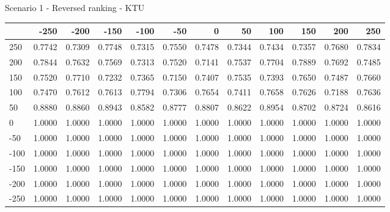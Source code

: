 Scenario 1 - Reversed ranking - KTU
\begin{tabular}{lrrrrrrrrrrr}
\toprule
{} &   -250 &   -200 &   -150 &   -100 &   -50  &    0   &    50  &    100 &    150 &    200 &    250 \\
\midrule
 250 & 0.7742 & 0.7309 & 0.7748 & 0.7315 & 0.7550 & 0.7478 & 0.7344 & 0.7434 & 0.7357 & 0.7680 & 0.7834 \\
 200 & 0.7844 & 0.7632 & 0.7569 & 0.7313 & 0.7520 & 0.7141 & 0.7537 & 0.7704 & 0.7889 & 0.7692 & 0.7485 \\
 150 & 0.7520 & 0.7710 & 0.7232 & 0.7365 & 0.7150 & 0.7407 & 0.7535 & 0.7393 & 0.7650 & 0.7487 & 0.7660 \\
 100 & 0.7470 & 0.7612 & 0.7613 & 0.7794 & 0.7306 & 0.7654 & 0.7411 & 0.7658 & 0.7626 & 0.7188 & 0.7636 \\
 50  & 0.8880 & 0.8860 & 0.8943 & 0.8582 & 0.8777 & 0.8807 & 0.8622 & 0.8954 & 0.8702 & 0.8724 & 0.8616 \\
 0   & 1.0000 & 1.0000 & 1.0000 & 1.0000 & 1.0000 & 1.0000 & 1.0000 & 1.0000 & 1.0000 & 1.0000 & 1.0000 \\
-50  & 1.0000 & 1.0000 & 1.0000 & 1.0000 & 1.0000 & 1.0000 & 1.0000 & 1.0000 & 1.0000 & 1.0000 & 1.0000 \\
-100 & 1.0000 & 1.0000 & 1.0000 & 1.0000 & 1.0000 & 1.0000 & 1.0000 & 1.0000 & 1.0000 & 1.0000 & 1.0000 \\
-150 & 1.0000 & 1.0000 & 1.0000 & 1.0000 & 1.0000 & 1.0000 & 1.0000 & 1.0000 & 1.0000 & 1.0000 & 1.0000 \\
-200 & 1.0000 & 1.0000 & 1.0000 & 1.0000 & 1.0000 & 1.0000 & 1.0000 & 1.0000 & 1.0000 & 1.0000 & 1.0000 \\
-250 & 1.0000 & 1.0000 & 1.0000 & 1.0000 & 1.0000 & 1.0000 & 1.0000 & 1.0000 & 1.0000 & 1.0000 & 1.0000 \\
\bottomrule
\end{tabular}


